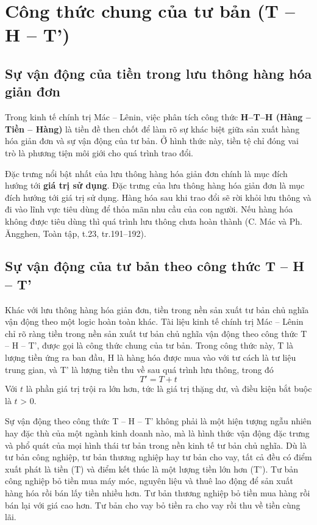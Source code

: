 \section{Công thức chung của tư bản (T – H – T')}
\subsection{Sự vận động của tiền trong lưu thông hàng hóa giản đơn}
Trong kinh tế chính trị Mác – Lênin, việc phân tích công thức \textbf{H–T–H (Hàng – Tiền – Hàng)} là tiền đề then chốt để làm rõ sự khác biệt giữa sản xuất hàng hóa giản đơn và sự vận động của tư bản. Ở hình thức này, tiền tệ chỉ đóng vai trò là phương tiện môi giới cho quá trình trao đổi.

Đặc trưng nổi bật nhất của lưu thông hàng hóa giản đơn chính là mục đích hướng tới \textbf{giá trị sử dụng}. Đặc trưng của lưu thông hàng hóa giản đơn là mục đích hướng tới giá trị sử dụng. Hàng hóa sau khi trao đổi sẽ rời khỏi lưu thông và đi vào lĩnh vực tiêu dùng để thỏa mãn nhu cầu của con người. Nếu hàng hóa không được tiêu dùng thì quá trình lưu thông chưa hoàn thành (C. Mác và Ph. Ăngghen, Toàn tập, t.23, tr.191–192).

\subsection{Sự vận động của tư bản theo công thức T – H – T'}
Khác với lưu thông hàng hóa giản đơn, tiền trong nền sản xuất tư bản chủ nghĩa vận động theo một logic hoàn toàn khác. Tài liệu kinh tế chính trị Mác – Lênin chỉ rõ ràng tiền trong nền sản xuất tư bản chủ nghĩa vận động theo công thức T – H – T', được gọi là công thức chung của tư bản. Trong công thức này, T là lượng tiền ứng ra ban đầu, H là hàng hóa được mua vào với tư cách là tư liệu trung gian, và T' là lượng tiền thu về sau quá trình lưu thông, trong đó 
\[
    T' = T + t
\] 
Với $t$ là phần giá trị trội ra lớn hơn, tức là giá trị thặng dư, và điều kiện bắt buộc là $t$ > 0.

Sự vận động theo công thức T – H – T' không phải là một hiện tượng ngẫu nhiên hay đặc thù của một ngành kinh doanh nào, mà là hình thức vận động đặc trưng và phổ quát của mọi hình thái tư bản trong nền kinh tế tư bản chủ nghĩa. Dù là tư bản công nghiệp, tư bản thương nghiệp hay tư bản cho vay, tất cả đều có điểm xuất phát là tiền (T) và điểm kết thúc là một lượng tiền lớn hơn (T'). Tư bản công nghiệp bỏ tiền mua máy móc, nguyên liệu và thuê lao động để sản xuất hàng hóa rồi bán lấy tiền nhiều hơn. Tư bản thương nghiệp bỏ tiền mua hàng rồi bán lại với giá cao hơn. Tư bản cho vay bỏ tiền ra cho vay rồi thu về tiền cùng lãi.

